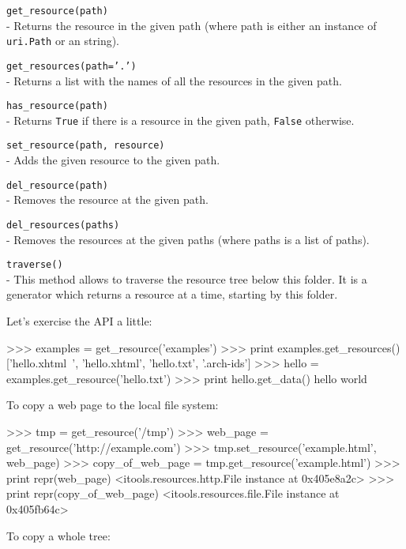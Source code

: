 \begin{api}
  {\tt get\_resource(path)}\\
  - Returns the resource in the given path (where path is either an instance
    of {\tt uri.Path} or an string).

  {\tt get\_resources(path='.')}\\
  - Returns a list with the names of all the resources in the given path.

  {\tt has\_resource(path)}\\
  - Returns {\tt True} if there is a resource in the given path, {\tt False}
    otherwise.

  {\tt set\_resource(path, resource)}\\
  - Adds the given resource to the given path.

  {\tt del\_resource(path)}\\
  - Removes the resource at the given path.

  {\tt del\_resources(paths)}\\
  - Removes the resources at the given paths (where paths is a list of paths).

  {\tt traverse()}\\
  - This method allows to traverse the resource tree below this folder. It
    is a generator which returns a resource at a time, starting by this
    folder.
\end{api}

Let's exercise the API a little:

\begin{code}
    >>> examples = get_resource('examples')
    >>> print examples.get_resources()
    ['hello.xhtml~', 'hello.xhtml', 'hello.txt', '.arch-ids']
    >>> hello = examples.get_resource('hello.txt')
    >>> print hello.get_data()
    hello world
\end{code}

To copy a web page to the local file system:

\begin{code}
    >>> tmp = get_resource('/tmp')
    >>> web_page = get_resource('http://example.com')
    >>> tmp.set_resource('example.html', web_page)
    >>> copy_of_web_page = tmp.get_resource('example.html')
    >>> print repr(web_page)
    <itools.resources.http.File instance at 0x405e8a2c>
    >>> print repr(copy_of_web_page)
    <itools.resources.file.File instance at 0x405fb64c>
\end{code}

To copy a whole tree:

